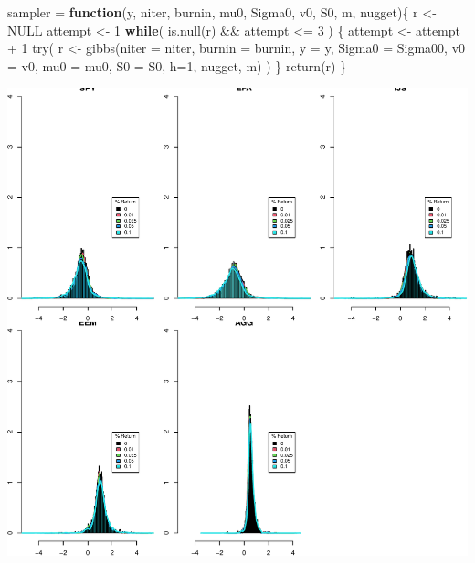 \documentclass[
]{article}
\newenvironment{Shaded}{\begin{snugshade}}{\end{snugshade}}
\newcommand{\AttributeTok}[1]{\textcolor[rgb]{0.77,0.63,0.00}{#1}}
\newcommand{\ConstantTok}[1]{\textcolor[rgb]{0.00,0.00,0.00}{#1}}
\newcommand{\ControlFlowTok}[1]{\textcolor[rgb]{0.13,0.29,0.53}{\textbf{#1}}}
\newcommand{\DecValTok}[1]{\textcolor[rgb]{0.00,0.00,0.81}{#1}}
\newcommand{\FunctionTok}[1]{\textcolor[rgb]{0.00,0.00,0.00}{#1}}
\newcommand{\NormalTok}[1]{#1}
\newcommand{\OtherTok}[1]{\textcolor[rgb]{0.56,0.35,0.01}{#1}}
\newcommand{\SpecialCharTok}[1]{\textcolor[rgb]{0.00,0.00,0.00}{#1}}
\begin{document}
\begin{Shaded}
\begin{Highlighting}[]
\NormalTok{sampler }\OtherTok{=} \ControlFlowTok{function}\NormalTok{(y, niter, burnin, mu0, Sigma0, v0, S0, m, nugget)\{}
\NormalTok{  r }\OtherTok{\textless{}{-}} \ConstantTok{NULL}
\NormalTok{  attempt }\OtherTok{\textless{}{-}} \DecValTok{1}
  \ControlFlowTok{while}\NormalTok{( }\FunctionTok{is.null}\NormalTok{(r) }\SpecialCharTok{\&\&}\NormalTok{ attempt }\SpecialCharTok{\textless{}=} \DecValTok{3}\NormalTok{ ) \{}
\NormalTok{    attempt }\OtherTok{\textless{}{-}}\NormalTok{ attempt }\SpecialCharTok{+} \DecValTok{1}
    \FunctionTok{try}\NormalTok{(}
\NormalTok{       r }\OtherTok{\textless{}{-}} \FunctionTok{gibbs}\NormalTok{(}\AttributeTok{niter =}\NormalTok{ niter, }\AttributeTok{burnin =}\NormalTok{ burnin,}
                      \AttributeTok{y =}\NormalTok{ y, }\AttributeTok{Sigma0 =}\NormalTok{ Sigma00, }\AttributeTok{v0 =}\NormalTok{ v0, }\AttributeTok{mu0 =}\NormalTok{ mu0, }\AttributeTok{S0 =}\NormalTok{ S0, }\AttributeTok{h=}\DecValTok{1}\NormalTok{, nugget, m)}
\NormalTok{    )}
\NormalTok{  \}}
  \FunctionTok{return}\NormalTok{(r)}
\NormalTok{\}}
\end{Highlighting}
\end{Shaded}

\begin{center}\includegraphics[width=8.5in]{portfolio_allocation_files/figure-latex/unnamed-chunk-3-1} \end{center}
\end{document}
